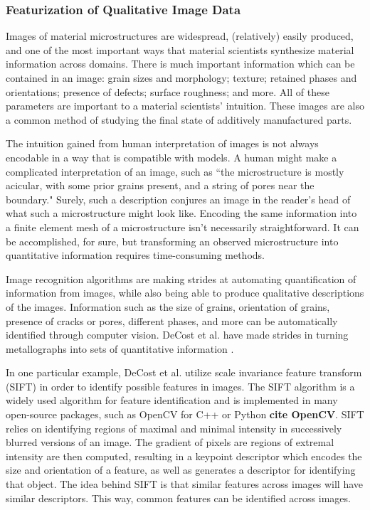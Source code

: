 \subsubsection{Featurization of Qualitative Image Data}
Images of material microstructures are widespread, (relatively) easily produced, and one of the most important ways that material scientists synthesize material information across domains. There is much important information which can be contained in an image: grain sizes and morphology; texture; retained phases and orientations; presence of defects; surface roughness; and more. All of these parameters are important to a material scientists' intuition. These images are also a common method of studying the final state of additively manufactured parts.

The intuition gained from human interpretation of images is not always encodable in a way that is compatible with models. A human might make a complicated interpretation of an image, such as ``the microstructure is mostly acicular, with some prior grains present, and a string of pores near the boundary." Surely, such a description conjures an image in the reader's head of what such a microstructure might look like. Encoding the same information into a finite element mesh of a microstructure isn't necessarily straightforward. It can be accomplished, for sure, but transforming an observed microstructure into quantitative information requires time-consuming methods.

Image recognition algorithms are making strides at automating quantification of information from images, while also being able to produce qualitative descriptions of the images. Information such as the size of grains, orientation of grains, presence of cracks or pores, different phases, and more can be automatically identified through computer vision. DeCost et al. have made strides in turning metallographs into sets of quantitative information \cite{DeCost2015, DeCost2017, DeCost2017a}. 

In one particular example, DeCost et al. utilize scale invariance feature transform (SIFT) in order to identify possible features in images. The SIFT algorithm is a widely used algorithm for feature identification and is implemented in many open-source packages, such as OpenCV for C++ or Python \textbf{cite OpenCV}. SIFT relies on identifying regions of maximal and minimal intensity in successively blurred versions of an image. The gradient of pixels are regions of extremal intensity are then computed, resulting in a keypoint descriptor which encodes the size and orientation of a feature, as well as generates a descriptor for identifying that object. The idea behind SIFT is that similar features across images will have similar descriptors. This way, common features can be identified across images.

